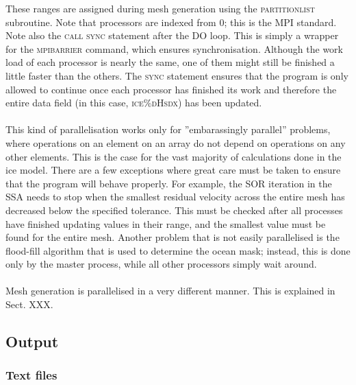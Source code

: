 \documentclass{article}
\begin{document}
These ranges are assigned during mesh generation using the \textsc{partition\textunderscore list} subroutine. Note that processors are indexed from 0; this is the MPI standard. Note also the \textsc{call sync} statement after the \textsc{DO} loop. This is simply a wrapper for the \textsc{mpi\textunderscore barrier} command, which ensures synchronisation. Although the work load of each processor is nearly the same, one of them might still be finished a little faster than the others. The \textsc{sync} statement ensures that the program is only allowed to continue once each processor has finished its work and therefore the entire data field (in this case, \textsc{ice\%dHs\textunderscore dx}) has been updated.\\
\\
This kind of parallelisation works only for ''embarassingly parallel'' problems, where operations on an element on an array do not depend on operations on any other elements. This is the case for the vast majority of calculations done in the ice model. There are a few exceptions where great care must be taken to ensure that the program will behave properly. For example, the SOR iteration in the SSA needs to stop when the smallest residual velocity across the entire mesh has decreased below the specified tolerance. This must be checked after all processes have finished updating values in their range, and the smallest value must be found for the entire mesh. Another problem that is not easily parallelised is the flood-fill algorithm that is used to determine the ocean mask; instead, this is done only by the master process, while all other processors simply wait around.\\
\\
Mesh generation is parallelised in a very different manner. This is explained in Sect. XXX.

\subsection{Output}

\subsubsection{Text files}
\end{document}
